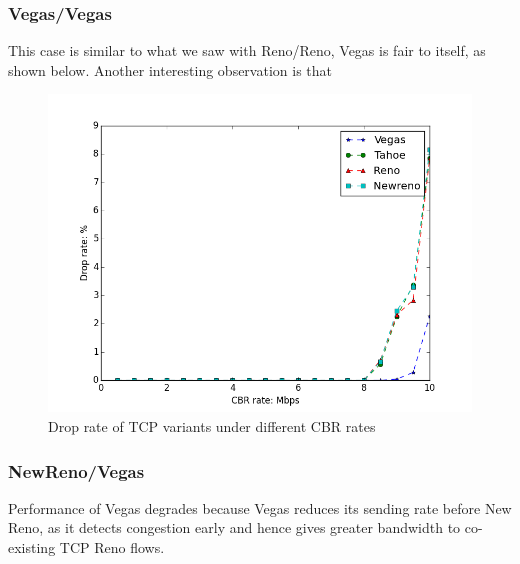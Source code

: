 \documentclass[10pt, conference]{IEEEtran/IEEEtran}
\begin{document}
\subsubsection{Vegas/Vegas}
This case is similar to what we saw with Reno/Reno, Vegas is fair to itself, as shown below. Another interesting observation is that %
\begin{figure}[htbp]
\begin{center}
\includegraphics[width=\linewidth]{../exp1/exp1_drop.png}
\caption{Drop rate of TCP variants under different CBR rates}
\label{exp1_drop}
\end{center}
\end{figure}

\subsubsection{NewReno/Vegas}

%
%
Performance of Vegas degrades because Vegas reduces its sending rate before New Reno, as it detects congestion early and hence gives greater bandwidth to co-existing TCP Reno flows.
\end{document}
